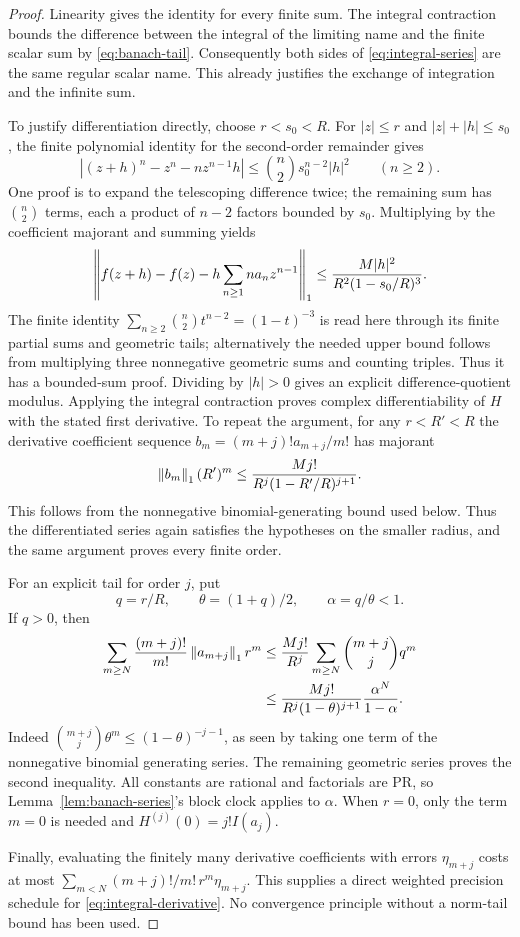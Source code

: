 \begin{proof}
Linearity gives the identity for every finite sum. The integral contraction
bounds the difference between the integral of the limiting name and the
finite scalar sum by \eqref{eq:banach-tail}. Consequently both sides of
\eqref{eq:integral-series} are the same regular scalar name. This already
justifies the exchange of integration and the infinite sum.

To justify differentiation directly, choose $r<s_0<R$. For
$|z|\le r$ and $|z|+|h|\le s_0$, the finite polynomial identity for
the second-order remainder gives
\[
 |(z+h)^n-z^n-nz^{n-1}h|
 \le \binom n2s_0^{n-2}|h|^2\qquad(n\ge2).
\]
One proof is to expand the telescoping difference twice; the remaining
sum has $\binom n2$ terms, each a product of $n-2$ factors bounded by
$s_0$. Multiplying by the coefficient majorant and summing yields
\begin{equation}\label{eq:holomorphic-remainder}
 \left\lVert f(z+h)-f(z)-h\sum_{n\ge1}na_nz^{n-1}\right\rVert_1
 \le\frac{M|h|^2}{R^2(1-s_0/R)^3}.
\end{equation}
The finite identity
$\sum_{n\ge2}\binom n2t^{n-2}=(1-t)^{-3}$ is read here through its
finite partial sums and geometric tails; alternatively the needed upper
bound follows from multiplying three nonnegative geometric sums and
counting triples. Thus it has a bounded-sum proof. Dividing by $|h|>0$
gives an explicit difference-quotient modulus. Applying the integral
contraction proves complex differentiability of $H$ with the stated first
derivative. To repeat the argument, for any $r<R'<R$ the derivative
coefficient sequence $b_m=(m+j)!a_{m+j}/m!$ has majorant
\[
 \left\lVert b_m\right\rVert_1(R')^m\le
 \frac{Mj!}{R^j(1-R'/R)^{j+1}}.
\]
This follows from the nonnegative binomial-generating bound used below.
Thus the differentiated series again satisfies the hypotheses on the
smaller radius, and the same argument proves every finite order.

For an explicit tail for order $j$, put
\[
 q=r/R,\qquad\theta=(1+q)/2,\qquad\alpha=q/\theta<1.
\]
If $q>0$, then
\begin{align}
 \sum_{m\ge N}\frac{(m+j)!}{m!}\left\lVert a_{m+j}\right\rVert_1r^m
 &\le\frac{Mj!}{R^j}
       \sum_{m\ge N}\binom{m+j}{j}q^m\notag\\
 &\le \frac{Mj!}{R^j(1-\theta)^{j+1}}
                  \frac{\alpha^N}{1-\alpha}.\label{eq:derivative-tail}
\end{align}
Indeed $\binom{m+j}{j}\theta^m\le(1-\theta)^{-j-1}$,
as seen by taking one term of the nonnegative binomial generating series.
The remaining geometric series proves the second inequality. All constants
are rational and factorials are PR, so Lemma~\ref{lem:banach-series}'s
block clock applies to $\alpha$. When $r=0$, only the term $m=0$ is
needed and $H^{(j)}(0)=j!I(a_j)$.

Finally, evaluating the finitely many derivative coefficients with errors
$\eta_{m+j}$ costs at most
$\sum_{m<N}(m+j)!/m!\,r^m\eta_{m+j}$. This supplies a direct weighted
precision schedule for \eqref{eq:integral-derivative}. No convergence
principle without a norm-tail bound has been used.
\end{proof}

